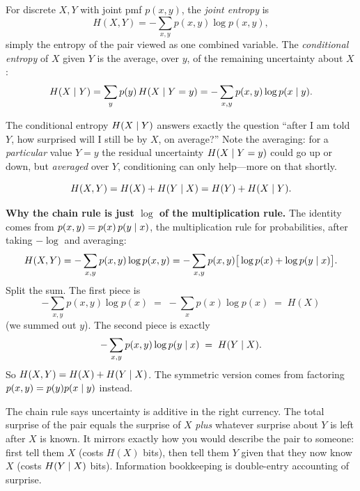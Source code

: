 \begin{definition}
\label{ch33:def-joint-cond}
For discrete $X,Y$ with joint pmf $p(x,y)$, the \emph{joint entropy} is
\[
  H(X,Y) = -\sum_{x,y} p(x,y)\log p(x,y),
\]
simply the entropy of the pair viewed as one combined variable. The \emph{conditional entropy} of $X$
given $Y$ is the average, over $y$, of the remaining uncertainty about $X$:
\[
  H(X \mid Y) = \sum_y p(y)\,H(X \mid Y = y)
              = -\sum_{x,y} p(x,y)\log p(x \mid y).
\]
\end{definition}

The conditional entropy $H(X \mid Y)$ answers exactly the question ``after I am told $Y$, how surprised
will I still be by $X$, on average?'' Note the averaging: for a \emph{particular} value $Y=y$ the residual
uncertainty $H(X \mid Y=y)$ could go up or down, but \emph{averaged} over $Y$, conditioning can only
help---more on that shortly.

\begin{theorem}
\label{ch33:chain-rule}
\[
  H(X,Y) = H(X) + H(Y \mid X) = H(Y) + H(X \mid Y).
\]
\end{theorem}

\begin{whybox}
\textbf{Why the chain rule is just $\log$ of the multiplication rule.} The identity comes from
$p(x,y) = p(x)\,p(y \mid x)$, the multiplication rule for probabilities, after taking $-\log$ and
averaging:
\[
  H(X,Y) = -\sum_{x,y} p(x,y)\log p(x,y)
         = -\sum_{x,y} p(x,y)\big[\log p(x) + \log p(y\mid x)\big].
\]
Split the sum. The first piece is
\[
  -\sum_{x,y} p(x,y)\log p(x) \;=\; -\sum_x p(x)\log p(x) \;=\; H(X)
\]
(we summed out $y$). The second piece is exactly
\[
  -\sum_{x,y} p(x,y)\log p(y\mid x) \;=\; H(Y\mid X).
\]
So $H(X,Y) = H(X) + H(Y\mid X)$. The symmetric version comes from factoring $p(x,y) = p(y)p(x\mid y)$ instead.
\end{whybox}

\begin{happeningbox}
The chain rule says uncertainty is additive in the right currency. The total surprise of the pair equals
the surprise of $X$ \emph{plus} whatever surprise about $Y$ is left after $X$ is known. It mirrors exactly
how you would describe the pair to someone: first tell them $X$ (costs $H(X)$ bits), then tell them $Y$
given that they now know $X$ (costs $H(Y\mid X)$ bits). Information bookkeeping is double-entry accounting of surprise.
\end{happeningbox}

